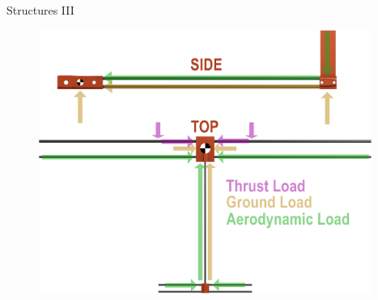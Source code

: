\documentclass{beamer}
\begin{document}
    \begin{frame}{Structures III} %
        \begin{figure}[htbp]
            \centering
            \includegraphics[width=0.97\textwidth]{figures/Structures III Load Map.png}
        \end{figure}
    \end{frame}
\end{document}
